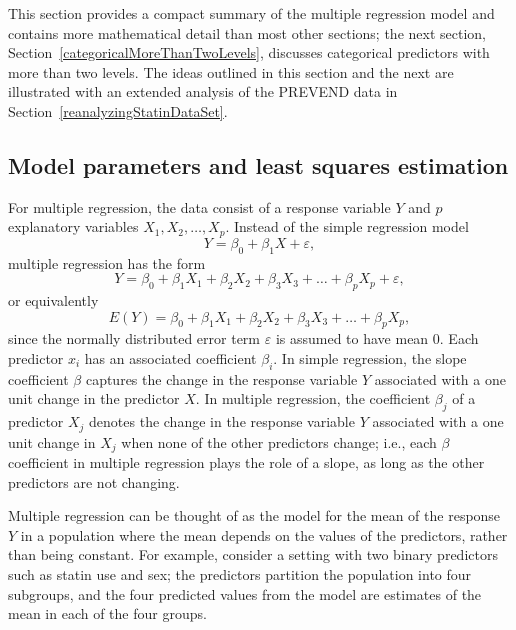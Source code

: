 This section provides a compact summary of the multiple regression model and contains more mathematical detail than most other sections; the next section, Section~\ref{categoricalMoreThanTwoLevels}, discusses categorical predictors with more than two levels. The ideas outlined in this section and the next are illustrated with an extended analysis of the PREVEND data in Section~\ref{reanalyzingStatinDataSet}. 
 
\subsection{Model parameters and least squares estimation}
 
For multiple regression, the data consist of a response variable $Y$ and $p$ explanatory variables $X_1, X_2,\ldots, X_p$.   Instead of the simple regression model 
 $${Y} = \beta_{0} + \beta_{1}X + {\varepsilon},$$
 multiple regression has the form
 $${Y} = \beta_{0} +
     \beta_{1}X_{1} + \beta_{2}X_{2} + \beta_{3}X_{3} + \dots +
     \beta_{p}X_{p} + \varepsilon,$$
or equivalently
 $$E(Y) = \beta_{0} + 
     \beta_{1}X_{1} + \beta_{2}X_{2} + \beta_{3}X_{3} + \dots +
     \beta_{p}X_{p},
	 \label{multipleRegressionModel}
	 $$ 
since the normally distributed error term $\varepsilon$ is assumed to have mean 0. Each predictor $x_i$ has an associated coefficient $\beta_i$.  In simple regression, the slope coefficient $\beta$ captures the change in the response variable $Y$ associated with a one unit change in the predictor $X$.  In multiple regression, the coefficient $\beta_j$ of a predictor $X_j$ denotes the change in the response variable $Y$ associated with a one unit change in $X_j$ when none of the other predictors change; i.e., each $\beta$ coefficient in multiple regression plays the role of a slope, as long as the other predictors are not changing.

Multiple regression can be thought of as the model for the mean of the response $Y$ in a population where the mean depends on the values of the predictors, rather than being constant. For example, consider a setting with two binary predictors such as statin use and sex; the predictors partition the population into four subgroups, and the four predicted values from the model are estimates of the mean in each of the four groups.

